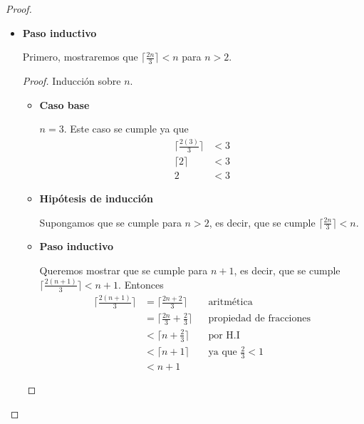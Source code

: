 \documentclass[letterpaper,11pt]{article}
\begin{document}
\begin{enumerate}
\begin{enumerate}
\begin{proof}
\begin{itemize}
                \item \textbf{Paso inductivo}

                Primero, mostraremos que $\lceil \frac{2n}{3} \rceil < n$ para 
                $n > 2$.
                \begin{proof}
                    Inducción sobre $n$.
                    \begin{itemize}
                        \item \textbf{Caso base}

                        $n = 3$. Este caso se cumple ya que 
                        \begin{align*}
                            \Big \lceil \frac{2(3)}{3} \Big \rceil &< 3 \\
                            \lceil 2 \rceil &< 3 \\ 
                            2 &< 3
                        \end{align*}

                        \item \textbf{Hipótesis de inducción}

                        Supongamos que se cumple para $n > 2$, es decir, que se 
                        cumple $\lceil \frac{2n}{3} \rceil < n$.  

                        \item \textbf{Paso inductivo}
                        
                        Queremos mostrar que se cumple para $n+1$, es decir, 
                        que se cumple $\lceil \frac{2(n+1)}{3} \rceil < n+1$. 
                        Entonces 
                        \begin{align*}
                            \Big \lceil \frac{2(n+1)}{3} \Big \rceil
                            &= \Big \lceil \frac{2n + 2}{3} \Big \rceil  
                            && \text{aritmética} \\
                            &= \Big \lceil \frac{2n}{3} + \frac{2}{3} \Big \rceil
                            && \text{propiedad de fracciones} \\
                            &< \Big \lceil n + \frac{2}{3} \Big \rceil
                            && \text{por H.I} \\
                            &< \lceil n + 1 \rceil
                            && \text{ya que $\frac{2}{3} < 1$} \\
                            &< n + 1
                        \end{align*}


\end{itemize}
\end{proof}
\end{itemize}
\end{proof}
\end{enumerate}
\end{enumerate}
\end{document}
